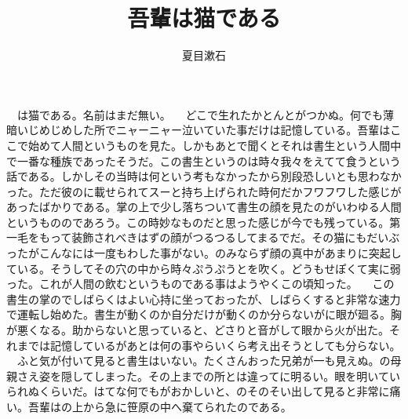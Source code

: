 \documentclass[a5j]{ltjtbook}
\title{吾輩は猫である}
\author{夏目漱石}
\date{}
\begin{document}
　は猫である。名前はまだ無い。 \newline
　どこで生れたかとんとがつかぬ。何でも薄暗いじめじめした所でニャーニャー泣いていた事だけは記憶している。吾輩はここで始めて人間というものを見た。しかもあとで聞くとそれは書生という人間中で一番な種族であったそうだ。この書生というのは時々我々をえてて食うという話である。しかしその当時は何という考もなかったから別段恐しいとも思わなかった。ただ彼のに載せられてスーと持ち上げられた時何だかフワフワした感じがあったばかりである。掌の上で少し落ちついて書生の顔を見たのがいわゆる人間というもののであろう。この時妙なものだと思った感じが今でも残っている。第一毛をもって装飾されべきはずの顔がつるつるしてまるでだ。その猫にもだいぶったがこんなには一度もわした事がない。のみならず顔の真中があまりに突起している。そうしてその穴の中から時々ぷうぷうとを吹く。どうもせぽくて実に弱った。これが人間の飲むというものである事はようやくこの頃知った。 \newline
　この書生の掌のでしばらくはよい心持に坐っておったが、しばらくすると非常な速力で運転し始めた。書生が動くのか自分だけが動くのか分らないがに眼が廻る。胸が悪くなる。助からないと思っていると、どさりと音がして眼から火が出た。それまでは記憶しているがあとは何の事やらいくら考え出そうとしても分らない。 \newline
　ふと気が付いて見ると書生はいない。たくさんおった兄弟が一も見えぬ。の母親さえ姿を隠してしまった。その上までの所とは違ってに明るい。眼を明いていられぬくらいだ。はてな何でもがおかしいと、のそのそい出して見ると非常に痛い。吾輩はの上から急に笹原の中へ棄てられたのである。 \newline
\end{document}
